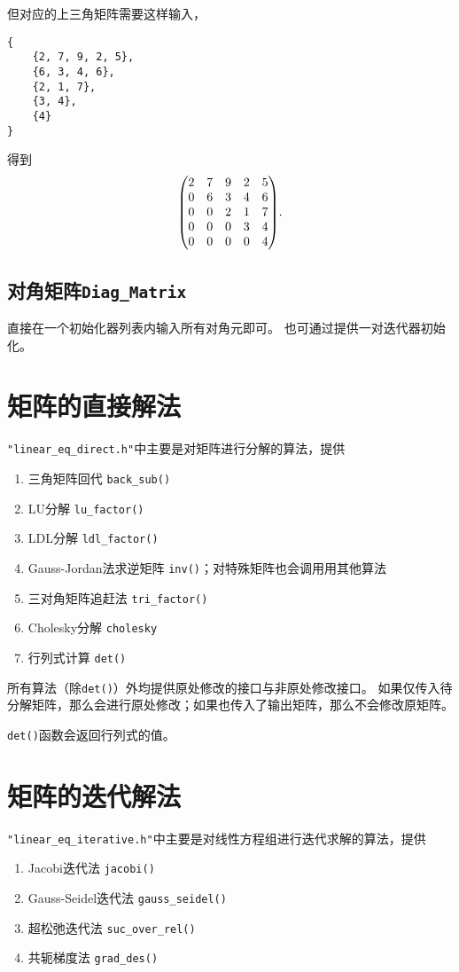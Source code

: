 但对应的上三角矩阵需要这样输入，
{\small
\begin{verbatim}
{
    {2, 7, 9, 2, 5},
    {6, 3, 4, 6},
    {2, 1, 7},
    {3, 4},
    {4}
}
\end{verbatim}
}
得到\[
    \mqty(
        2&7&9&2&5\\
        0&6&3&4&6\\
        0&0&2&1&7\\
        0&0&0&3&4\\
        0&0&0&0&4
    ).
\]

\subsection{对角矩阵\texttt{Diag\_Matrix}}
直接在一个初始化器列表内输入所有对角元即可。
也可通过提供一对迭代器初始化。

\section{矩阵的直接解法}
\texttt{"linear\_eq\_direct.h"}中主要是对矩阵进行分解的算法，提供\begin{enumerate}
    \item 三角矩阵回代 \texttt{back_sub()}
    \item LU分解 \texttt{lu\_factor()}
    \item LDL分解 \texttt{ldl\_factor()}
    \item Gauss-Jordan法求逆矩阵 \texttt{inv()}；对特殊矩阵也会调用用其他算法
    \item 三对角矩阵追赶法 \texttt{tri\_factor()}
    \item Cholesky分解 \texttt{cholesky}
    \item 行列式计算 \texttt{det()}
\end{enumerate}

所有算法（除\texttt{det()}）外均提供原处修改的接口与非原处修改接口。
如果仅传入待分解矩阵，那么会进行原处修改；如果也传入了输出矩阵，那么不会修改原矩阵。

\texttt{det()}函数会返回行列式的值。

\section{矩阵的迭代解法}
\texttt{"linear\_eq\_iterative.h"}中主要是对线性方程组进行迭代求解的算法，提供\begin{enumerate}
    \item Jacobi迭代法 \texttt{jacobi()}
    \item Gauss-Seidel迭代法 \texttt{gauss\_seidel()}
    \item 超松弛迭代法 \texttt{suc\_over\_rel()}
    \item 共轭梯度法 \texttt{grad\_des()}
\end{enumerate}

